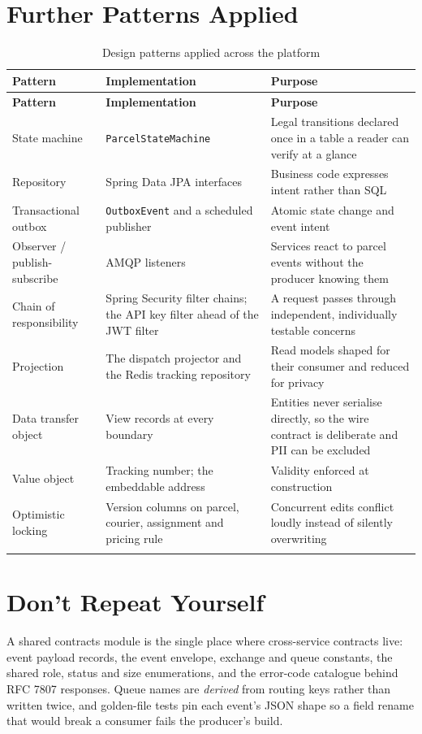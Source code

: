 \documentclass[11pt,a4paper,oneside,openany]{report}
\newcommand{\code}[1]{\texttt{\small #1}}
\begin{document}
\section{Further Patterns Applied}
\begin{center}
\small
\begin{longtable}{@{}p{3.6cm}p{4.6cm}p{6.1cm}@{}}
\toprule
\textbf{Pattern} & \textbf{Implementation} & \textbf{Purpose} \\
\midrule
\endfirsthead
\toprule
\textbf{Pattern} & \textbf{Implementation} & \textbf{Purpose} \\
\midrule
\endhead
State machine & \code{ParcelStateMachine} & Legal transitions declared once in a table a reader
can verify at a glance \\
\addlinespace
Repository & Spring Data JPA interfaces & Business code expresses intent rather than SQL \\
\addlinespace
Transactional outbox & \code{OutboxEvent} and a scheduled publisher & Atomic state change and
event intent \\
\addlinespace
Observer / publish-subscribe & AMQP listeners & Services react to parcel events without the
producer knowing them \\
\addlinespace
Chain of responsibility & Spring Security filter chains; the API key filter ahead of the JWT
filter & A request passes through independent, individually testable concerns \\
\addlinespace
Projection & The dispatch projector and the Redis tracking repository & Read models shaped for
their consumer and reduced for privacy \\
\addlinespace
Data transfer object & View records at every boundary & Entities never serialise directly, so the
wire contract is deliberate and PII can be excluded \\
\addlinespace
Value object & Tracking number; the embeddable address & Validity enforced at construction \\
\addlinespace
Optimistic locking & Version columns on parcel, courier, assignment and pricing rule & Concurrent
edits conflict loudly instead of silently overwriting \\
\bottomrule
\caption{Design patterns applied across the platform}\label{tab:patterns2}
\end{longtable}
\end{center}

\section{Don't Repeat Yourself}
A shared contracts module is the single place where cross-service contracts live: event payload
records, the event envelope, exchange and queue constants, the shared role, status and size
enumerations, and the error-code catalogue behind RFC 7807 responses. Queue names are
\emph{derived} from routing keys rather than written twice, and golden-file tests pin each event's
JSON shape so a field rename that would break a consumer fails the producer's build.
\end{document}
